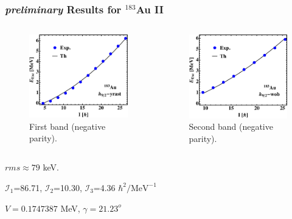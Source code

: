\documentclass{beamer}
\begin{document}
\begin{frame}
    \frametitle{{\tiny \emph{preliminary}} Results for $^{183}$Au II}
    \begin{columns}[c] 
     \begin{figure}
         \centering
         \includegraphics[scale=0.4]{figs/Au_183_plot1Negative.pdf}
         \caption{First band (negative parity).}
     \end{figure}
     \begin{figure}
         \centering
         \includegraphics[scale=0.4]{figs/Au_183_plot2Negative.pdf}
         \caption{Second band (negative parity).}
     \end{figure}
    \end{columns}
    \par $rms\approx79$ keV.
    \par $\mathcal{I}_1$=86.71, $\mathcal{I}_2$=10.30, $\mathcal{I}_3$=4.36 $\hbar^2/\text{MeV}^{-1}$
    \par $V=0.1747387$ MeV, $\gamma=21.23^o$
\end{frame}
\end{document}
